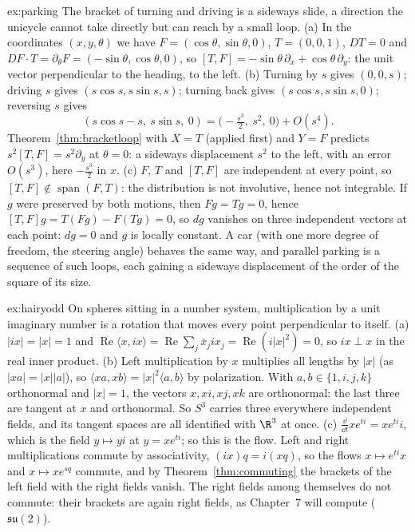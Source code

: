 \begin{solution}{ex:parking}
\idea The bracket of turning and driving is a sideways slide, a direction the unicycle cannot take directly but can reach by a small loop.
\writeup (a) In the coordinates $(x,y,\theta)$ we have $F=(\cos\theta,\sin\theta,0)$, $T=(0,0,1)$, $DT=0$ and $DF\cdot T=\partial_\theta F=(-\sin\theta,\cos\theta,0)$, so
$[T,F]=-\sin\theta\,\partial_x+\cos\theta\,\partial_y$: the unit vector perpendicular to the heading, to the left. (b) Turning by $s$ gives $(0,0,s)$; driving $s$ gives
$(s\cos s,s\sin s,s)$; turning back gives $(s\cos s,s\sin s,0)$; reversing $s$ gives \[(s\cos s-s,\ s\sin s,\ 0)=\bigl(-\tfrac{s^3}2,\ s^2,\ 0\bigr)+O(s^4).\] Theorem~\ref{thm:bracketloop}
with $X=T$ (applied first) and $Y=F$ predicts $s^2[T,F]=s^2\partial_y$ at $\theta=0$: a sideways displacement $s^2$ to the left, with an error $O(s^3)$, here
$-\frac{s^3}2$ in $x$. (c) $F$, $T$ and $[T,F]$ are independent at every point, so $[T,F]\notin\operatorname{span}(F,T)$: the distribution is not involutive, hence not
integrable. If $g$ were preserved by both motions, then $Fg=Tg=0$, hence $[T,F]g=T(Fg)-F(Tg)=0$, so $dg$ vanishes on three independent vectors at each point:
$dg=0$ and $g$ is locally constant. A car (with one more degree of freedom, the steering angle) behaves the same way, and parallel parking is a sequence
of such loops, each gaining a sideways displacement of the order of the square of its size.
\end{solution}

\begin{solution}{ex:hairyodd}
\idea On spheres sitting in a number system, multiplication by a unit imaginary number is a rotation that moves every point perpendicular to itself.
\writeup (a) $|ix|=|x|=1$ and $\operatorname{Re}\langle x,ix\rangle=\operatorname{Re}\sum_j\bar x_jix_j=\operatorname{Re}(i|x|^2)=0$, so $ix\perp x$ in the real inner product. (b) Left multiplication
by $x$ multiplies all lengths by $|x|$ (as $|xa|=|x||a|$), so $\langle xa,xb\rangle=|x|^2\langle a,b\rangle$ by polarization. With $a,b\in\{1,i,j,k\}$
orthonormal and $|x|=1$, the vectors $x,xi,xj,xk$ are orthonormal: the last three are tangent at $x$ and orthonormal. So $S^3$ carries three everywhere
independent fields, and its tangent spaces are all identified with $\R^3$ at once. (c) $\frac{\dd}{\dd t}xe^{ti}=xe^{ti}i$, which is the field $y\mapsto yi$
at $y=xe^{ti}$; so this is the flow. Left and right multiplications commute by associativity, $(ix)q=i(xq)$, so the flows $x\mapsto e^{ti}x$ and $x\mapsto xe^{sq}$ commute,
and by Theorem~\ref{thm:commuting} the brackets of the left field with the right fields vanish. The right fields among themselves do not commute: their
brackets are again right fields, as Chapter~7 will compute ($\mathfrak{su}(2)$).
\end{solution}

